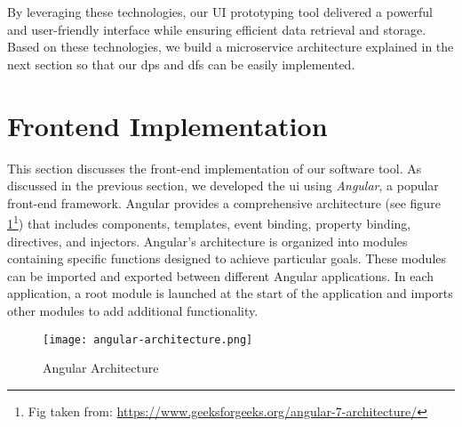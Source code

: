 By leveraging these technologies, our UI prototyping tool delivered a powerful and user-friendly interface while ensuring efficient data retrieval and storage.
Based on these technologies, we build a microservice architecture explained in the next section so that our \ac{dp}s and \ac{df}s can be easily implemented. 
\clearpage


\section{Frontend Implementation}
\label{implementation:section:frontend}

This section discusses the front-end implementation of our software tool. 
As discussed in the previous section, we developed the \ac{ui} using \textit{Angular}, a popular front-end framework. 
Angular provides a comprehensive architecture (see figure \ref{implementation:fig:angulararchitecture}\footnote{Fig taken from: \url{https://www.geeksforgeeks.org/angular-7-architecture/}}) that includes components, templates, event binding, property binding, directives, and injectors. 
Angular's architecture is organized into modules containing specific functions designed to achieve particular goals. 
These modules can be imported and exported between different Angular applications. 
In each application, a root module is launched at the start of the application and imports other modules to add additional functionality.

\begin{figure}[ht]
    \centering
    \texttt{[image: angular-architecture.png]}
    \caption[Angular Architecture]{Angular Architecture}
    \label{implementation:fig:angulararchitecture}
\end{figure}

